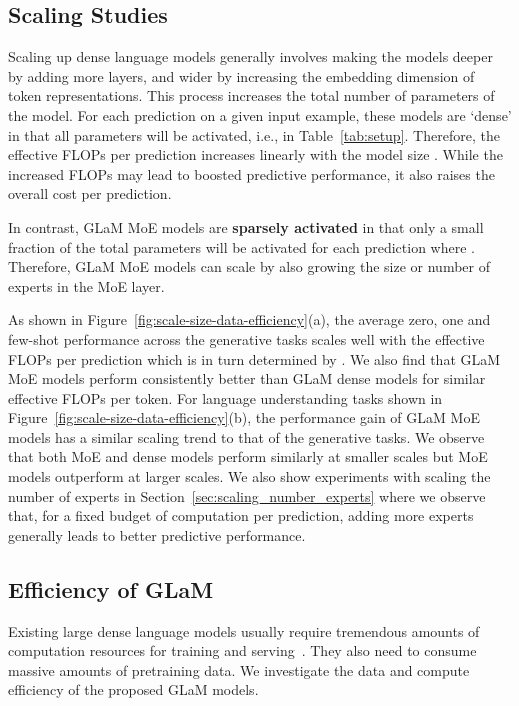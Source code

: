 \documentclass{article}
\newcommand{\glam}{GLaM\xspace}
\begin{document}
\subsection{Scaling Studies}\label{sec:model_scaling}
Scaling up dense language models generally involves making the models deeper by adding more layers, and wider by increasing the embedding dimension of token representations. This process increases the total number of parameters  of the model. For each prediction on a given input example, these models are `dense' in that all  parameters will be activated, i.e.,  in Table~\ref{tab:setup}. Therefore, the effective FLOPs per prediction increases linearly with the model size . While the increased FLOPs may lead to boosted predictive performance, it also raises the overall cost per prediction.

In contrast, \glam MoE models are \textbf{sparsely activated} in that only a small fraction of the total  parameters will be activated for each prediction where . Therefore,  
\glam MoE models can scale by also growing the size or number of experts in the MoE layer.













As shown in Figure~\ref{fig:scale-size-data-efficiency}(a), the average zero, one and few-shot performance across the generative tasks scales well with the effective FLOPs per prediction which is in turn determined by . We also find that \glam MoE models perform consistently better than \glam dense models for similar effective FLOPs per token. For language understanding tasks shown in Figure~\ref{fig:scale-size-data-efficiency}(b), the performance gain of \glam MoE models has a similar scaling trend to that of the generative tasks. We observe that both MoE and dense models perform similarly at smaller scales but MoE models outperform at larger scales. We also show experiments with scaling the number of experts in Section~\ref{sec:scaling_number_experts} where we observe that, for a fixed budget of computation per prediction, adding more experts generally leads to better predictive performance.
\subsection{Efficiency of \glam}
Existing large dense language models usually require tremendous amounts of computation resources for training and serving~\cite{patterson2021carbon}. They also need to consume massive amounts of pretraining data. 
We investigate the data and compute efficiency of the proposed \glam models.
\end{document}
